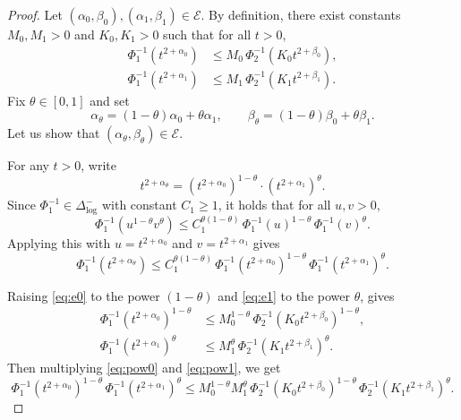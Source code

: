 \documentclass[12pt]{amsart}
\begin{document}
\begin{proof}
Let $(\alpha_0, \beta_0), (\alpha_1, \beta_1) \in \mathcal{E}$. By definition,
there exist constants $M_0, M_1 > 0$ and $K_0, K_1 > 0$ such that for all $t > 0$,
\begin{align}
\Phi_1^{-1}\!\left( t^{2+\alpha_0} \right) &\le M_0\,\Phi_2^{-1}\!\left( K_0 t^{2+\beta_0} \right), \label{eq:e0}\\
\Phi_1^{-1}\!\left( t^{2+\alpha_1} \right) &\le M_1\,\Phi_2^{-1}\!\left( K_1 t^{2+\beta_1} \right). \label{eq:e1}
\end{align}
Fix $\theta \in [0,1]$ and set
\[
\alpha_\theta = (1-\theta)\alpha_0 + \theta\alpha_1, \qquad
\beta_\theta = (1-\theta)\beta_0 + \theta\beta_1.
\]
Let us show that $(\alpha_\theta, \beta_\theta) \in \mathcal{E}$.

For any $t > 0$, write
\[
t^{2+\alpha_\theta}
= \left(t^{2+\alpha_0}\right)^{1-\theta}
\cdot \left(t^{2+\alpha_1}\right)^{\theta}.
\]
Since $\Phi_1^{-1}\in\Delta_{\log}^-$ with constant $C_1\ge 1$, it holds that for all $u,v>0$,
\[
\Phi_1^{-1}\!\left(u^{1-\theta}v^{\theta}\right) \le C_1^{\theta(1-\theta)}\,
\Phi_1^{-1}(u)^{1-\theta}\,\Phi_1^{-1}(v)^{\theta}.
\]
Applying this with $u = t^{2+\alpha_0}$ and $v = t^{2+\alpha_1}$ gives
\begin{equation}\label{eq:step1}
\Phi_1^{-1}(t^{2+\alpha_\theta})
\le C_1^{\theta(1-\theta)}\,
\Phi_1^{-1}(t^{2+\alpha_0})^{1-\theta}\,
\Phi_1^{-1}(t^{2+\alpha_1})^{\theta}.
\end{equation}

Raising \eqref{eq:e0} to the power $(1-\theta)$ and \eqref{eq:e1}
to the power $\theta$, gives 
\begin{align}
\Phi_1^{-1}(t^{2+\alpha_0})^{1-\theta}
&\le M_0^{1-\theta}\,\Phi_2^{-1}(K_0 t^{2+\beta_0})^{1-\theta},\label{eq:pow0}\\
\Phi_1^{-1}(t^{2+\alpha_1})^{\theta}
&\le M_1^{\theta}\,\Phi_2^{-1}(K_1 t^{2+\beta_1})^{\theta}.\label{eq:pow1}
\end{align}
Then multiplying \eqref{eq:pow0} and \eqref{eq:pow1}, we get
\begin{equation}\label{eq:step2}
\Phi_1^{-1}(t^{2+\alpha_0})^{1-\theta}\,
\Phi_1^{-1}(t^{2+\alpha_1})^{\theta}
\le M_0^{1-\theta} M_1^{\theta}\,
\Phi_2^{-1}(K_0 t^{2+\beta_0})^{1-\theta}\,
\Phi_2^{-1}(K_1 t^{2+\beta_1})^{\theta}.
\end{equation}


\end{proof}
\end{document}

